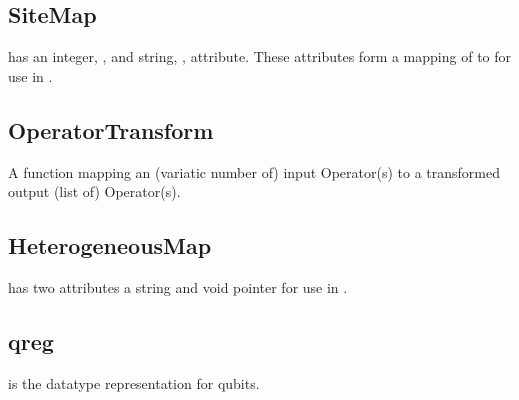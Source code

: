 

\subsection{\textbf{SiteMap}}\label{subsec:Sitemap}
 has an integer, , and string, , attribute. These attributes form a mapping of  to  for use in \Clang.

\subsection{\textbf{OperatorTransform}}\label{subsec:OperatorTransform}
 A function mapping an (variatic number of) input Operator(s) to a transformed output (list of) Operator(s). 

\subsection{\textbf{HeterogeneousMap}}\label{subsec:HeterogeneousMap}
 has two attributes a string  and void pointer  for use in \Clang.

\subsection{\textbf{qreg}}\label{subsec:qreg}
 is the datatype representation for qubits.
